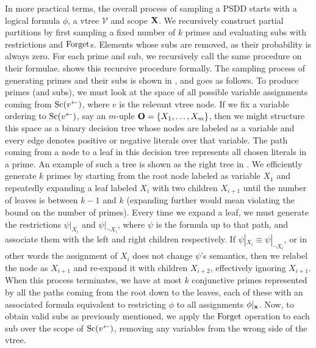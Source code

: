 In more practical terms, the overall process of sampling a PSDD starts with a logical formula
$\phi$, a vtree $\mathcal{V}$ and scope $\mathbf{X}$. We recursively construct partial partitions by
first sampling a fixed number of $k$ primes and evaluating subs with restrictions and $\operatorname{\normalfont{Forget}}$s.
Elements whose subs are removed, as their probability is always zero. For each prime and sub, we
recursively call the same procedure on their formulae.  shows this recursive
procedure formally. The sampling process of generating primes and their subs is shown in
, and goes as follows. To produce primes (and subs), we must look at the
space of all possible variable assignments coming from $\operatorname*{\normalfont{Sc}}(v^\gets)$, where $v$ is the
relevant vtree node. If we fix a variable ordering to $\operatorname*{\normalfont{Sc}}(v^\gets)$, say an $m$-uple $\mathbf{O}=\{
X_1,\ldots,X_m\}$, then we might structure this space as a binary decision tree whose nodes are
labeled as a variable and every edge denotes positive or negative literals over that variable. The
path coming from a node to a leaf in this decision tree represents all chosen literals in a prime.
An example of such a tree is shown as the right tree in . We efficiently
generate $k$ primes by starting from the root node labeled as variable $X_1$ and repeatedly
expanding a leaf labeled $X_i$ with two children $X_{i+1}$ until the number of leaves is between
$k-1$ and $k$ (expanding further would mean violating the bound on the number of primes). Every
time we expand a leaf, we must generate the restrictions $\psi|_{X_i}$ and $\psi|_{\neg X_i}$,
where $\psi$ is the formula up to that path, and associate them with the left and right children
respectively. If $\psi|_{X_i}\equiv\psi|_{\neg X_i}$, or in other words the assignment of $X_i$
does not change $\psi$'s semantics, then we relabel the node as $X_{i+1}$ and re-expand it with
children $X_{i+2}$, effectively ignoring $X_{i+1}$. When this process terminates, we have at most
$k$ conjunctive primes represented by all the paths coming from the root down to the leaves, each
of these with an associated formula equivalent to restricting $\phi$ to all assignments
$\phi|_{\mathbf{x}}$. Now, to obtain valid subs as previously mentioned, we apply the $\operatorname{\normalfont{Forget}}$
operation to each sub over the scope of $\operatorname*{\normalfont{Sc}}(v^\gets)$, removing any variables from the wrong side
of the vtree.

